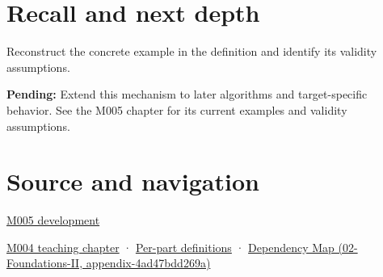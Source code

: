 \section{Recall and next depth}\label{appendix-ed8531b46754-recall-and-next-depth}

Reconstruct the concrete example in the definition and identify its validity assumptions.

\textbf{Pending:} Extend this mechanism to later algorithms and target-specific behavior. See the M005 chapter for its current examples and validity assumptions.

\section{Source and navigation}\label{appendix-ed8531b46754-source-and-navigation}

\href{Continuous\%20Notes/Computing\%20Foundations\%20-\%20From\%20Bits\%20to\%20C++\%20and\%20Systems\%20APIs\#When\%20arithmetic\%20meets\%20uncertainty}{M005 development}

\href{Continuous\%20Notes/Computing\%20Foundations\%20-\%20From\%20Bits\%20to\%20C++\%20and\%20Systems\%20APIs\#A\%20stretching\%20ruler\%20for\%20real-valued\%20quantities}{M004 teaching chapter} · \hyperref[appendix-fd090d982a15-m004---parts-61-76]{Per-part definitions} · \href{../02-Foundations-II/main.pdf\#nameddest=appendix-4ad47bdd269a}{Dependency Map (02-Foundations-II, appendix-4ad47bdd269a)}
